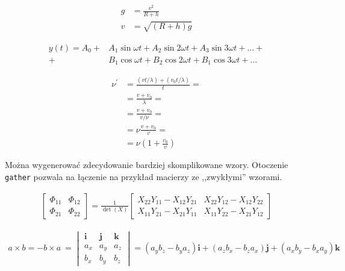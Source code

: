 \begin{align}
    g & = \frac{v^2}{R+h} \\
    v & = \sqrt{ \left( R+h \right) g }
\end{align}

\begin{align}
    y(t) = A_0
    +& A_1 \sin \omega t +
    A_2 \sin 2 \omega t +
    A_3 \sin 3 \omega t + \ldots + \nonumber \\
    +& B_1 \cos \omega t +
    B_2 \cos 2 \omega t +
    B_1 \cos 3 \omega t + \ldots
\end{align}

\begin{align}
    \nu^\prime  &= \frac{\left(vt / \lambda \right) + \left( v_0t / \lambda \right)}{t} = \nonumber\\
    &= \frac{v + v_0}{\lambda} = \nonumber\\
    &= \frac{v + v_0}{v / \nu} = \nonumber\\
    &= \nu \frac{v+v_0}{v} = \nonumber\\
    &= \nu \left( 1 + \frac{v_0}{v} \right)
\end{align}

Można wygenerować zdecydowanie bardziej skomplikowane wzory. Otoczenie \texttt{gather}
pozwala na łączenie na przykład macierzy ze ,,zwykłymi'' wzorami.

\begin{gather}
    \begin{bmatrix}
        \Phi_{11} & \Phi_{12} \\ \Phi_{21} & \Phi_{22}
    \end{bmatrix}
    =
    \frac{1}{\det(X)}
    \begin{bmatrix}
        X_{22} Y_{11} - X_{12} Y_{21} &
        X_{22} Y_{12} - X_{12} Y_{22} \\
        X_{11} Y_{21} - X_{21} Y_{11} &
        X_{11} Y_{22} - X_{21} Y_{12}
    \end{bmatrix}
\end{gather}

\begin{gather}
    a \times b = -b \times a~=
    \begin{vmatrix}
        \pmb{i} & \pmb{j} & \pmb{k} \\
        a_x     & a_y     & a_z     \\
        b_x     & b_y     & b_z
    \end{vmatrix}
    = \left(a_y b_z - b_y a_z \right)\pmb{i}
    + \left(a_z b_x - b_z a_x \right)\pmb{j}
    + \left(a_x b_y - b_x a_y \right)\pmb{k}
\end{gather}

